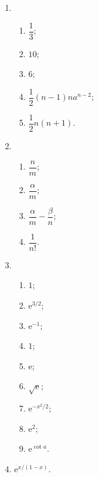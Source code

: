 



% 

\begin{enumerate}
    \item %
        \begin{enumerate}[(1)]
            \item %
                $\dfrac13$;
            \item %
                $10$;
            \item %
                $6$;
            \item %
                $\dfrac12 (n-1)na^{n-2}$;
            \item %
                $\dfrac12 n(n+1)$.
        \end{enumerate}
    \item %
        \begin{enumerate}[(1)]
            \item %
                $\dfrac{n}{m}$;
            \item %
                $\dfrac{\alpha}{m}$;
            \item %
                $\dfrac{\alpha}{m} - \dfrac{\beta}{n}$;
            \item %
                $\dfrac{1}{n!}$.
        \end{enumerate}
    \item %
        \begin{enumerate}[(1)]
            \item %
                $1$;
            \item %
                $\mathrm{e}^{3/2}$;
            \item %
                $\mathrm{e}^{-1}$;
            \item %
                $1$;
            \item %
                $\mathrm{e}$;
            \item %
                $\sqrt{\mathrm{e}}$;
            \item %
                $\mathrm{e}^{-x^2/2}$;
            \item %
                $\mathrm{e}^2$;
            \item %
                $\mathrm{e}^{\cot a}$.
        \end{enumerate}
    \item %
        $\mathrm{e}^{x/(1-x)}$.
\end{enumerate}
% 